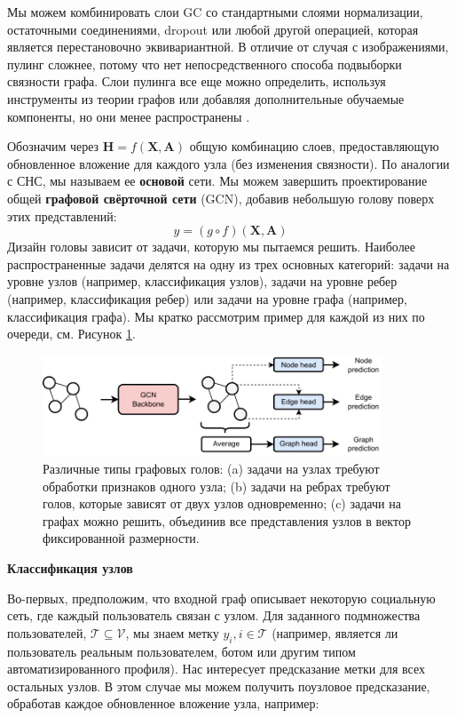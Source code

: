 Мы можем комбинировать слои GC со стандартными слоями нормализации, остаточными соединениями, dropout или любой другой операцией, которая является перестановочно эквивариантной. В отличие от случая с изображениями, пулинг сложнее, потому что нет непосредственного способа подвыборки связности графа. Слои пулинга все еще можно определить, используя инструменты из теории графов или добавляя дополнительные обучаемые компоненты, но они менее распространены \cite{grattarola2022understanding}.

Обозначим через $\mathbf{H} = f(\mathbf{X}, \mathbf{A})$ общую комбинацию слоев, предоставляющую обновленное вложение для каждого узла (без изменения связности). По аналогии с СНС, мы называем ее \textbf{основой} сети. Мы можем завершить проектирование общей \textbf{графовой свёрточной сети} (GCN), добавив небольшую голову поверх этих представлений:
%
$$
y=(g\circ f)(\mathbf{X},\mathbf{A})
$$
%
Дизайн головы зависит от задачи, которую мы пытаемся решить. Наиболее распространенные задачи делятся на одну из трех основных категорий: задачи на уровне узлов (например, классификация узлов), задачи на уровне ребер (например, классификация ребер) или задачи на уровне графа (например, классификация графа). Мы кратко рассмотрим пример для каждой из них по очереди, см. Рисунок \ref{fig:graph_heads}.

\begin{figure}[t]
    \centering
    \includegraphics[width=0.9\textwidth]{images/graph_heads}
    \caption{Различные типы графовых голов: (a) задачи на узлах требуют обработки признаков одного узла; (b) задачи на ребрах требуют голов, которые зависят от двух узлов одновременно; (c) задачи на графах можно решить, объединив все представления узлов в вектор фиксированной размерности.}
    \label{fig:graph_heads}
\end{figure}

\textbf{Классификация узлов}

Во-первых, предположим, что входной граф описывает некоторую социальную сеть, где каждый пользователь связан с узлом. Для заданного подмножества пользователей, $\mathcal{T} \subseteq \mathcal{V}$, мы знаем метку $y_i, i \in \mathcal{T}$ (например, является ли пользователь реальным пользователем, ботом или другим типом автоматизированного профиля). Нас интересует предсказание метки для всех остальных узлов. В этом случае мы можем получить поузловое предсказание, обработав каждое обновленное вложение узла, например:

